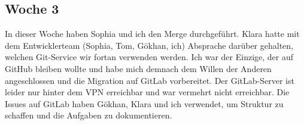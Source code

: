 \subsection{Woche 3}\label{subsec:woche3}
In dieser Woche haben Sophia und ich den Merge durchgeführt.
Klara hatte mit dem Entwicklerteam (Sophia, Tom, Gökhan, ich) Absprache darüber gehalten,
welchen Git-Service wir fortan verwenden werden.
Ich war der Einzige, der auf GitHub bleiben wollte und habe mich demnach dem Willen der Anderen
angeschlossen und die Migration auf GitLab vorbereitet.
Der GitLab-Server ist leider nur hinter dem VPN erreichbar und war vermehrt nicht erreichbar.
Die Issues auf GitLab haben Gökhan, Klara und ich verwendet, um Struktur zu schaffen und
die Aufgaben zu dokumentieren.
